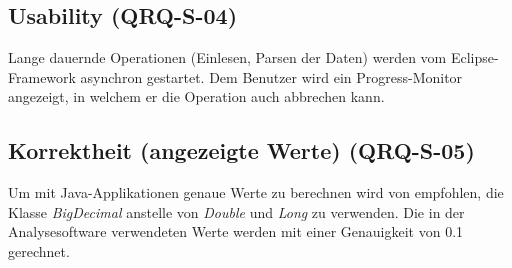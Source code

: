 \subsection{Usability (QRQ-S-04)}
Lange dauernde Operationen (Einlesen, Parsen der Daten) werden vom Eclipse-Framework asynchron gestartet. Dem Benutzer wird ein Progress-Monitor angezeigt, in welchem er die Operation auch abbrechen kann.

\subsection{Korrektheit (angezeigte Werte) (QRQ-S-05)}
Um mit Java-Applikationen genaue Werte zu berechnen wird von \cite{bloch2008effective} empfohlen, die Klasse \textit{BigDecimal} anstelle von \textit{Double} und \textit{Long} zu verwenden. Die in der Analysesoftware verwendeten Werte werden mit einer Genauigkeit von 0.1 gerechnet.
